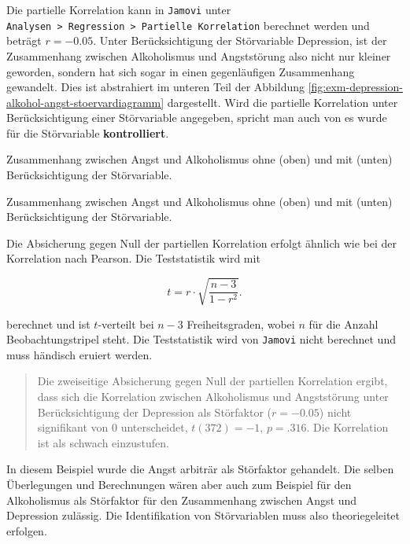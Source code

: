\documentclass[
]{book}
\theoremstyle{definition}
\theoremstyle{definition}
\theoremstyle{definition}
\theoremstyle{definition}
\theoremstyle{remark}
\begin{document}
Die partielle Korrelation kann in \texttt{Jamovi} unter \texttt{Analysen\ \textgreater{}\ Regression\ \textgreater{}\ Partielle\ Korrelation} berechnet werden und beträgt \(r = -0.05\). Unter Berücksichtigung der Störvariable Depression, ist der Zusammenhang zwischen Alkoholismus und Angststörung also nicht nur kleiner geworden, sondern hat sich sogar in einen gegenläufigen Zusammenhang gewandelt. Dies ist abstrahiert im
unteren Teil der Abbildung \ref{fig:exm-depression-alkohol-angst-stoervardiagramm} dargestellt. Wird die partielle Korrelation unter Berücksichtigung einer Störvariable angegeben, spricht man auch von es wurde für die Störvariable \textbf{kontrolliert}.

\label{fig:exm-depression-alkohol-angst-stoervardiagramm}Zusammenhang zwischen Angst und Alkoholismus ohne (oben) und mit (unten) Berücksichtigung der Störvariable.

\label{fig:exm-depression-alkohol-angst-stoervardiagramm}Zusammenhang zwischen Angst und Alkoholismus ohne (oben) und mit (unten) Berücksichtigung der Störvariable.

Die Absicherung gegen Null der partiellen Korrelation erfolgt ähnlich wie bei der Korrelation nach Pearson. Die Teststatistik wird mit

\begin{equation}
t = r\cdot \sqrt{\frac{n-3}{1-r^2}}.
\label{eq:absichern-partial}
\end{equation}

berechnet und ist \(t\)-verteilt bei \(n-3\) Freiheitsgraden, wobei \(n\) für die Anzahl Beobachtungstripel steht. Die Teststatistik wird von \texttt{Jamovi} nicht berechnet und muss händisch eruiert werden.

\begin{quote}
Die zweiseitige Absicherung gegen Null der partiellen Korrelation ergibt, dass sich die Korrelation zwischen Alkoholismus und Angststörung unter Berücksichtigung der Depression als Störfaktor (\(r = -0.05\)) nicht signifikant von \(0\) unterscheidet, \(t(372) = -1\), \(p = .316\). Die Korrelation ist als schwach einzustufen.
\end{quote}

In diesem Beispiel wurde die Angst arbiträr als Störfaktor gehandelt. Die selben Überlegungen und Berechnungen wären aber auch zum Beispiel für den Alkoholismus als Störfaktor für den Zusammenhang zwischen Angst und Depression zulässig. Die Identifikation von Störvariablen muss also theoriegeleitet erfolgen.
\end{document}
